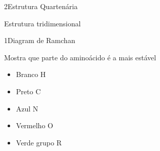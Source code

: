 \documentclass[\mainfilename]{subfiles}
\begin{document}
\begin{sectionBox}2{Estrutura Quartenária}
    
    Estrutura tridimensional
    
\end{sectionBox}

\begin{sectionBox}1{Diagram de Ramchan}
    
    Mostra que parte do aminoácido é a mais estável

    \begin{itemize}
        \item Branco H
        \item Preto C
        \item Azul N
        \item Vermelho O
        \item Verde grupo R
    \end{itemize}
    
\end{sectionBox}
\end{document}

